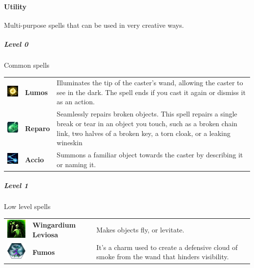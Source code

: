 \paragraph{Utility} 
Multi-purpose spells that can be used in very creative ways. 

\subparagraph{Level 0} 
Common spells \\
\begin{tabular}{ m{2cm}m{3cm}m{8cm}} 
  \includegraphics[width=2cm]{../Pictures/Gameplay/Spells/Icon/Lumos_spell_icon.png} & \textbf{Lumos} & Illuminates the tip of the caster's wand, allowing the caster to see in the dark. The spell ends if you cast it again or dismiss it as an action.\\ 
	\includegraphics[width=2cm]{../Pictures/Gameplay/Spells/Icon/Reparo_spell_icon.png} & \textbf{Reparo} & Seamlessly repairs broken objects. This spell repairs a single break or tear in an object you touch, such as a broken chain link, two halves of a broken key, a torn cloak, or a leaking wineskin \\ 
	\includegraphics[width=2cm]{../Pictures/Gameplay/Spells/Icon/Accio_spell_icon.png} & \textbf{Accio} &  Summons a familiar object towards the caster by describing it or naming it. \\ 
\end{tabular}

\subparagraph{Level 1} 
 Low level spells\\
\begin{tabular}{ m{2cm}m{3cm}m{8cm} } 
 \includegraphics[width=2cm]{../Pictures/Gameplay/Spells/Icon/Wingardium_spell_icon.png} & \textbf{Wingardium Leviosa} & Makes objects fly, or levitate.   \\ 
	\includegraphics[width=2cm]{../Pictures/Gameplay/Spells/Icon/Fumos_spell_icon.png} & \textbf{Fumos} & It's a charm used to create a defensive cloud of smoke from the wand that hinders visibility. \\  
\end{tabular}

